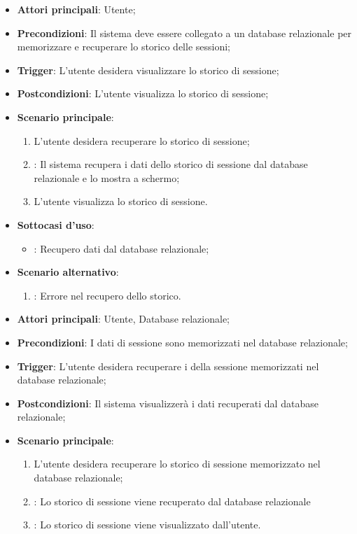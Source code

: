 \begin{itemize}
    \item \textbf{Attori principali}: Utente;
    \item \textbf{Precondizioni}: Il sistema deve essere collegato a un database relazionale per memorizzare e recuperare lo storico delle sessioni;
    \item \textbf{Trigger}: L'utente desidera visualizzare lo storico di sessione;
    \item \textbf{Postcondizioni}: L'utente visualizza lo storico di sessione;
    \item \textbf{Scenario principale}:
    \begin{enumerate}
        \item L'utente desidera recuperare lo storico di sessione;
        \item {}: Il sistema recupera i dati dello storico di sessione dal database relazionale e lo mostra a schermo;
        \item L'utente visualizza lo storico di sessione.
    \end{enumerate}

    \item \textbf{Sottocasi d'uso}:
    \begin{itemize}
        \item {}: Recupero dati dal database relazionale;
    \end{itemize}
    \item \textbf{Scenario alternativo}:
    \begin{enumerate}
        \item {}: Errore nel recupero dello storico.
    \end{enumerate}
\end{itemize}

\hypertarget{UC9.1}{}

\begin{itemize}
    \item \textbf{Attori principali}: Utente, Database relazionale;
    \item \textbf{Precondizioni}: I dati di sessione sono memorizzati nel database relazionale;
    \item \textbf{Trigger}: L'utente desidera recuperare i della sessione memorizzati nel database relazionale;
    \item \textbf{Postcondizioni}: Il sistema visualizzerà i dati recuperati dal database relazionale;
    \item \textbf{Scenario principale}:
    \begin{enumerate}
        \item L'utente desidera recuperare lo storico di sessione memorizzato nel database relazionale;
        \item {}: Lo storico di sessione viene recuperato dal database relazionale
        \item {}: Lo storico di sessione viene visualizzato dall'utente.
    \end{enumerate}
\end{itemize}


